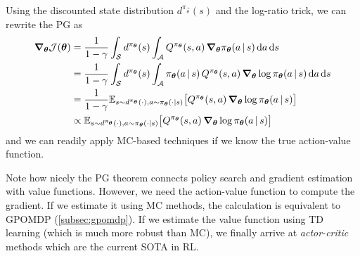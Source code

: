 		\begin{remark}
			Using the discounted state distribution \( d^{\pi_{\vec{\theta}}}(s) \) and the log-ratio trick, we can rewrite the \ac{PG} as
			\begin{align}
				\grad_{\bm{\theta}} \mathcal{J}(\bm{\theta})
				 & = \frac{1}{1 - \gamma} \int_\mathcal{S} d^{\pi_{\bm{\theta}}}(s) \int_\mathcal{A} Q^{\pi_{\bm{\theta}}}(s, a) \, \grad_{\bm{\theta}} \pi_{\bm{\theta}}(a \,\vert\, s) \dd{a} \dd{s}                                        \\
				 & = \frac{1}{1 - \gamma} \int_\mathcal{S} d^{\pi_{\bm{\theta}}}(s) \int_\mathcal{A} \pi_{\bm{\theta}}(a \,\vert\, s) \, Q^{\pi_{\bm{\theta}}}(s, a) \, \grad_{\bm{\theta}} \log \pi_{\bm{\theta}}(a \,\vert\, s) \dd{a} \dd{s} \\
				 & = \frac{1}{1 - \gamma} \mathbb{E}_{s \sim d^{\pi_{\bm{\theta}}}(\cdot), a \sim \pi_{\bm{\theta}}(\cdot \vert s)}\bigl[ Q^{\pi_{\bm{\theta}}}(s, a) \, \grad_{\bm{\theta}} \log \pi_{\bm{\theta}}(a \,\vert\, s) \bigr]        \\
				 & \propto \mathbb{E}_{s \sim d^{\pi_{\bm{\theta}}}(\cdot), a \sim \pi_{\bm{\theta}}(\cdot \vert s)}\bigl[ Q^{\pi_{\bm{\theta}}}(s, a) \, \grad_{\bm{\theta}} \log \pi_{\bm{\theta}}(a \,\vert\, s) \bigr]  \label{eq:pgt}
			\end{align}
			and we can readily apply \ac{MC}-based techniques if we know the true action-value function.
		\end{remark}

		Note how nicely the \ac{PG} theorem connects policy search and gradient estimation with value functions. However, we need the action-value function to compute the gradient. If we estimate it using \ac{MC} methods, the calculation is equivalent to \ac{GPOMDP} (\autoref{subsec:gpomdp}). If we estimate the value function using \ac{TD} learning (which is much more robust than \ac{MC}), we finally arrive at \emph{actor-critic} methods which are the current \ac{SOTA} in \ac{RL}.

